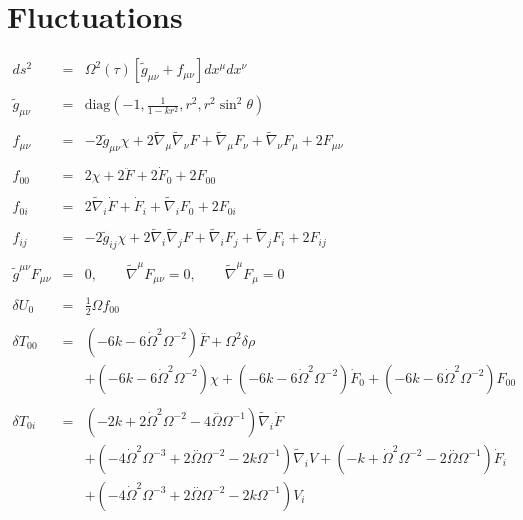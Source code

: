 \documentclass[10pt,letterpaper]{article}
\numberwithin{equation}{section}
\begin{document}
\section{Fluctuations}
\begin{eqnarray}
ds^2 &=& \Omega^2(\tau)[\tilde g_{\mu\nu}+ f_{\mu\nu}] dx^\mu dx^\nu
\\ \nonumber\\
\tilde g_{\mu\nu} &=& \text{diag}\left(-1,\frac{1}{1-kr^2},r^2,r^2\sin^2\theta\right)
\\ \nonumber\\
f_{\mu\nu} &=& -2\tilde g_{\mu\nu}\chi + 2\tilde\nabla_\mu \tilde\nabla_\nu F + \tilde\nabla_\mu F_\nu +\tilde\nabla_\nu F_\mu+ 2F_{\mu\nu}
\label{svt}
\\ \nonumber\\
f_{00} &=& 2\chi + 2 \ddot F + 2\dot{F}_0 + 2 F_{00}
\\ \nonumber\\
f_{0i} &=& 2\tilde\nabla_i \dot F + \dot F_i+ \tilde\nabla_i F_0 + 2F_{0i}
\\ \nonumber\\
f_{ij} &=& -2\tilde g_{ij} \chi + 2\tilde\nabla_i \tilde\nabla_j F + \tilde\nabla_i F_j + \tilde\nabla_j F_i + 2F_{ij}
\\ \nonumber\\
\tilde g^{\mu\nu} F_{\mu\nu} &=&0,\qquad \tilde\nabla^\mu F_{\mu\nu} = 0,\qquad \tilde\nabla^\mu F_\mu = 0
\\ \nonumber\\
\delta U_0 &=& \tfrac12 \Omega f_{00}
\\ \nonumber\\
\delta T_{00}&=& (-6 k - 6 \dot{\Omega}^2 \Omega^{-2}) \overset{..}{F} + \Omega^2 \delta \rho \nonumber \\ 
&& + (-6 k - 6 \dot{\Omega}^2 \Omega^{-2}) \chi +(-6 k - 6 \dot{\Omega}^2 \Omega^{-2}) \dot{F}_{0}{}+(-6 k - 6 \dot{\Omega}^2 \Omega^{-2}) F_{00}{}
\\  \nonumber\\ 
\delta T_{0i}&=& (-2 k + 2 \dot{\Omega}^2 \Omega^{-2} - 4 \overset{..}{\Omega} \Omega^{-1}) \tilde{\nabla}_{i}\dot{F} \nonumber \\ 
&& + (-4 \dot{\Omega}^2 \Omega^{-3} + 2 \overset{..}{\Omega} \Omega^{-2} - 2 k \Omega^{-1}) \tilde{\nabla}_{i}V+(- k + \dot{\Omega}^2 \Omega^{-2} - 2 \overset{..}{\Omega} \Omega^{-1}) \dot{F}_{i} \nonumber \\ 
&& + (-4 \dot{\Omega}^2 \Omega^{-3} + 2 \overset{..}{\Omega} \Omega^{-2} - 2 k \Omega^{-1}) V_{i} \nonumber \\ 

\end{eqnarray}
\end{document}
